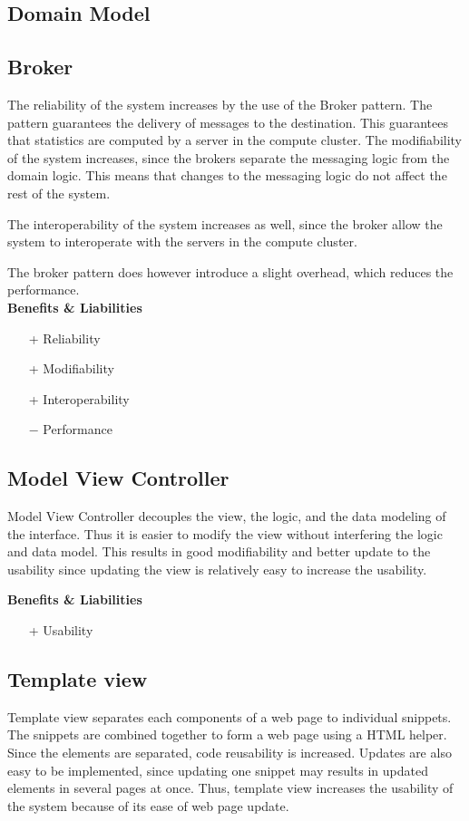 \subsection*{Domain Model}
\subsection*{Broker}
The reliability of the system increases by the use of the Broker pattern. The pattern guarantees the delivery of messages to the destination. This guarantees that statistics are computed by a server in the compute cluster.
The modifiability of the system increases, since the brokers separate the messaging logic from the domain logic. This means that changes to the messaging logic do not affect the rest of the system.

The interoperability of the system increases as well, since the broker allow the system to interoperate with the servers in the compute cluster.

The broker pattern does however introduce a slight overhead, which reduces the performance.\\
\textbf{Benefits \& Liabilities} ~
\begin{itemize}
\item[+] Reliability
\item[+] Modifiability
\item[+] Interoperability
\item[$-$] Performance
\end{itemize}

\subsection*{Model View Controller}
Model View Controller decouples the view, the logic, and the data modeling of the interface. Thus it is easier to modify the view without interfering the logic and data model. This results in good modifiability and better update to the usability since updating the view is relatively easy to increase the usability.

\textbf{Benefits \& Liabilities} ~
\begin{itemize} 
\item[+] Usability
\end{itemize}

\subsection*{Template view}
Template view separates each components of a web page to individual snippets. The snippets are combined together to form a web page using a HTML helper. Since the elements are separated, code reusability is increased. Updates are also easy to be implemented, since updating one snippet may results in updated elements in several pages at once. Thus, template view increases the usability of the system because of its ease of web page update.

